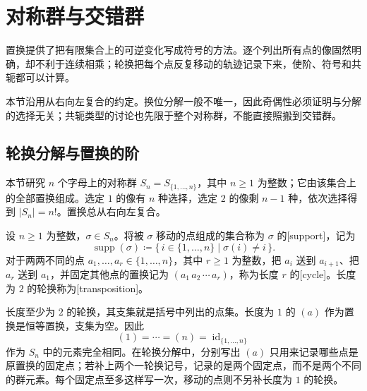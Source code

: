 
\section{对称群与交错群}
\label{b1:sec:0302}

%
%

置换提供了把有限集合上的可逆变化写成符号的方法。逐个列出所有点的像固然明确，却不利于连续相乘；轮换把每个点反复移动的轨迹记录下来，使阶、符号和共轭都可以计算。

\ProseParagraphBreak
本节沿用从右向左复合的约定。换位分解一般不唯一，因此奇偶性必须证明与分解的选择无关；共轭类型的讨论也先限于整个对称群，不能直接照搬到交错群。

\subsection{轮换分解与置换的阶}
\label{b1:subsec:0302:01}

本节研究 \(n\) 个字母上的对称群 \(S_n=S_{\{1,\ldots,n\}}\)，其中 \(n\geq1\) 为整数；它由该集合上的全部置换组成。选定 \(1\) 的像有 \(n\) 种选择，选定 \(2\) 的像剩 \(n-1\) 种，依次选择得到 \(\lvert S_n\rvert=n!\)。置换总从右向左复合。

\begin{definition}\label{b1:def:cycle}
	设 \(n\geq1\) 为整数，\(\sigma\in S_n\)。将被 \(\sigma\) 移动的点组成的集合称为 \(\sigma\) 的[support]，记为
	\[
		\operatorname{supp}(\sigma)\coloneqq \bigl\{\,i\in\{1,\ldots,n\}\mid\sigma(i)\ne i\,\bigr\}.
	\]
	对于两两不同的点 \(a_1,\ldots,a_r\in\{1,\ldots,n\}\)，其中 \(r\geq1\) 为整数，把 \(a_i\) 送到 \(a_{i+1}\)、把 \(a_r\) 送到 \(a_1\)，并固定其他点的置换记为 \((a_1\,a_2\,\cdots\,a_r)\)，称为长度 \(r\) 的[cycle]。长度为 \(2\) 的轮换称为[transposition]。
\end{definition}

长度至少为 \(2\) 的轮换，其支集就是括号中列出的点集。长度为 \(1\) 的 \((a)\) 作为置换是恒等置换，支集为空。因此
\[
	(1)=\cdots=(n)=\operatorname{id}_{\{1,\ldots,n\}}
\]
作为 \(S_n\) 中的元素完全相同。在轮换分解中，分别写出 \((a)\) 只用来记录哪些点是原置换的固定点；若补上两个一轮换记号，记录的是两个固定点，而不是两个不同的群元素。每个固定点至多这样写一次，移动的点则不另补长度为 \(1\) 的轮换。

